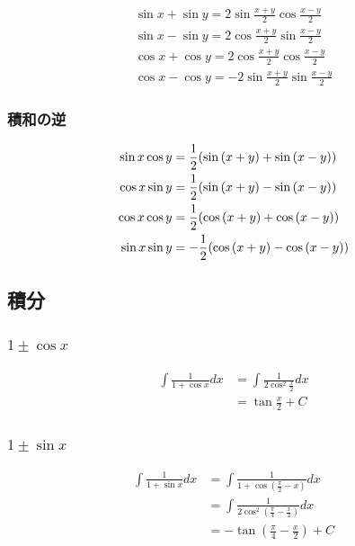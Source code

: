 \documentclass[a4paper, 10pt, dvipdfmx]{jlreq}
\begin{document}
\begin{align*}
  \sin{x}+\sin{y}=2\sin{\frac{x+y}{2}}\cos{\frac{x-y}{2}} \\
  \sin{x}-\sin{y}=2\cos{\frac{x+y}{2}}\sin{\frac{x-y}{2}} \\
  \cos{x}+\cos{y}=2\cos{\frac{x+y}{2}}\cos{\frac{x-y}{2}} \\
  \cos{x}-\cos{y}=-2\sin{\frac{x+y}{2}}\sin{\frac{x-y}{2}}
\end{align*}

\subsubsection{積和の逆}

\begin{align*}
  \sin{x}\cos{y} & =\frac{1}{2}\qty(\sin{(x+y)}+\sin{(x-y)})  \\
  \cos{x}\sin{y} & =\frac{1}{2}\qty(\sin{(x+y)}-\sin{(x-y)})  \\
  \cos{x}\cos{y} & =\frac{1}{2}\qty(\cos{(x+y)}+\cos{(x-y)})  \\
  \sin{x}\sin{y} & =-\frac{1}{2}\qty(\cos{(x+y)}-\cos{(x-y)})
\end{align*}

\subsection{積分}

\subsubsection{$1\pm\cos{x}$}

\begin{align*}
  \int \frac{1}{1+\cos{x}}dx & = \int \frac{1}{2\cos^2{\frac{x}{2}}} dx \\
                             & = \tan{\frac{x}{2}}+C
\end{align*}

\subsubsection{$1\pm\sin{x}$}

\begin{align*}
  \int \frac{1}{1+\sin{x}}dx & = \int \frac{1}{1+\cos{(\frac{\pi}{2}-x)}} dx            \\
                             & = \int \frac{1}{2\cos^2{(\frac{\pi}{4}-\frac{x}{2})}} dx \\
                             & = -\tan{(\frac{\pi}{4}-\frac{x}{2})}+C
\end{align*}
\end{document}
